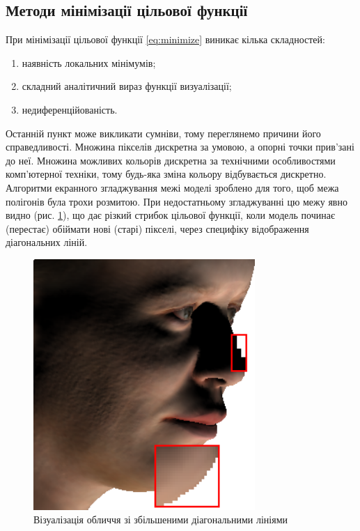 \subsection{Методи мінімізації цільової функції}

При мінімізації цільової функції \eqref{eq:minimize}
виникає кілька складностей:
\begin{enumerate}
  \item наявність локальних мінімумів;
  \item складний аналітичний вираз функції визуалізації;
  \item недиференційованість.
\end{enumerate}

Останній пункт може викликати сумніви,
тому переглянемо причини його справедливості.
Множина пікселів дискретна за умовою, а опорні точки прив'зані до неї.
Множина можливих кольорів дискретна за технічними особливостями
комп'ютерної техніки, тому будь-яка зміна кольору відбувається дискретно.
Алгоритми екранного згладжування межі моделі зроблено для того,
щоб межа полігонів була трохи розмитою.
При недостатньому згладжуванні цю межу явно видно
(рис. \ref{fig:calculation:smoothing-issue}),
що дає різкий стрибок цільової функції,
коли модель починає (перестає) обіймати нові (старі) пікселі,
через специфіку відображення діагональних ліній.

\begin{figure}[h]
  \centering
  \includegraphics[width=0.75\textwidth]{images/face-unsmoothed.png}
  \caption{Візуалізація обличчя зі збільшеними діагональними лініями}
  \label{fig:calculation:smoothing-issue}
\end{figure}

